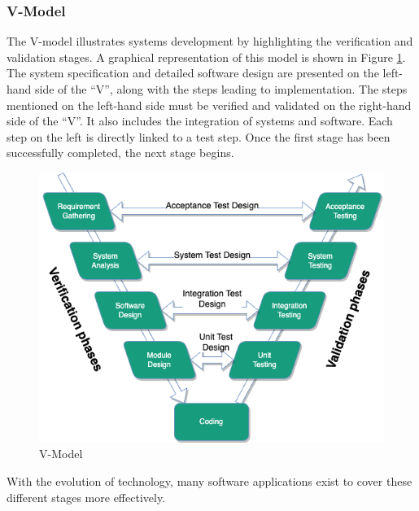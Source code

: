     
\subsubsection{V-Model}
The V-model illustrates systems development by highlighting the verification and validation stages. A graphical representation of this model is shown in Figure \ref{fig:v-model}. The system specification and detailed software design are presented on the left-hand side of the “V”, along with the steps leading to implementation. The steps mentioned on the left-hand side must be verified and validated on the right-hand side of the “V”. It also includes the integration of systems and software. Each step on the left is directly linked to a test step. Once the first stage has been successfully completed, the next stage begins.\\

\begin{figure}[H]
    \centering
    \includegraphics[scale=0.6]{images/V-Model.png}
    \caption{\label{fig:v-model} V-Model \cite{clark2009system} }
\end{figure}

With the evolution of technology, many software applications exist to cover these different stages more effectively. 